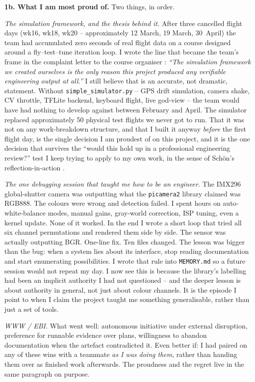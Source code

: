 \textbf{1b. What I am most proud of.}  Two things, in order.

\textit{The simulation framework, and the thesis behind it.} After three cancelled flight days (wk16, wk18, wk20 -- approximately 12 March, 19 March, 30~April) the team had accumulated zero seconds of real flight data on a course designed around a fly--test--tune iteration loop. I wrote the line that became the team's frame in the complaint letter to the course organiser \cite{complaintletter}: \textit{``The simulation framework we created ourselves is the only reason this project produced any verifiable engineering output at all.''} I still believe that is an accurate, not dramatic, statement. Without \texttt{simple\_simulator.py} -- GPS drift simulation, camera shake, CV throttle, TFLite backend, keyboard flight, live god-view -- the team would have had nothing to develop against between February and April. The simulator replaced approximately 50 physical test flights we never got to run. That it was not on any work-breakdown structure, and that I built it anyway \textit{before} the first flight day, is the single decision I am proudest of on this project, and it is the one decision that survives the ``would this hold up in a professional engineering review?'' test I keep trying to apply to my own work, in the sense of Sch\"on's reflection-in-action \cite{schon1983}.

\textit{The one debugging session that taught me how to be an engineer.} The IMX296 global-shutter camera was outputting what the \texttt{picamera2} library claimed was RGB888. The colours were wrong and detection failed. I spent hours on auto-white-balance modes, manual gains, gray-world correction, ISP tuning, even a kernel update. None of it worked. In the end I wrote a short loop that tried all six channel permutations and rendered them side by side. The sensor was actually outputting BGR. One-line fix. Ten files changed. The lesson was bigger than the bug: when a system lies about its interface, stop reading documentation and start enumerating possibilities. I wrote that rule into \texttt{MEMORY.md} so a future session would not repeat my day. I now see this is because the library's labelling had been an implicit authority I had not questioned -- and the deeper lesson is about authority in general, not just about colour channels. It is the episode I point to when I claim the project taught me something generalisable, rather than just a set of tools.

\textit{WWW / EBI.} What went well: autonomous initiative under external disruption, preference for runnable evidence over plans, willingness to abandon documentation when the artefact contradicted it. Even better if: I had paired on any of these wins with a teammate \textit{as I was doing them}, rather than handing them over as finished work afterwards. The proudness and the regret live in the same paragraph on purpose.

